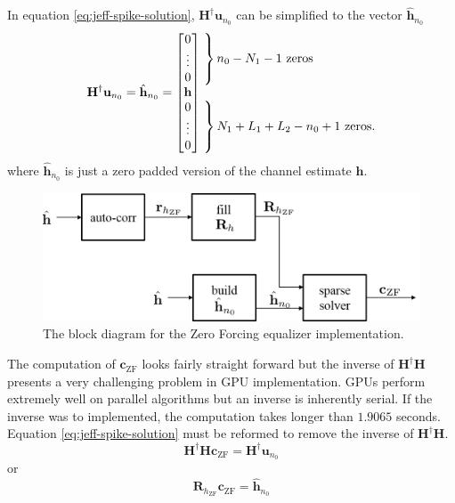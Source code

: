 In equation \eqref{eq:jeff-spike-solution}, $\mathbf{H}^\dag\mathbf{u}_{n_0}$ can be simplified to the vector $\hat{\mathbf{h}}_{n_0}$
\begin{equation}
	\mathbf{H}^\dag\mathbf{u}_{n_0} = \hat{\mathbf{h}}_{n_0} = \begin{bmatrix} 0 \\ \vdots \\ 0 \\ \mathbf{h} \\ 0 \\ \vdots \\ 0 \end{bmatrix}
	\begin{matrix*}[l] \left. \vphantom{\begin{matrix} 0 \\ \vdots \\ 0 \end{matrix}} \right\}
		\text{$n_0-N_1-1$ zeros}
		\\ \\
		\left. \vphantom{\begin{matrix} 0 \\ \vdots \\ 0 \end{matrix}} \right\}
		\text{$N_1+L_1+L_2-n_0+1$ zeros.}
		\end{matrix*}
\label{eq:hun0-vector-def}
\end{equation}
where $\hat{\mathbf{h}}_{n_0}$ is just a zero padded version of the channel estimate $\mathbf{h}$.

\begin{figure}
	\centering\includegraphics[width=\textwidth/10*8]{figures/gpu/ZFblock.png}
	\caption{The block diagram for the Zero Forcing equalizer implementation.}
	\label{fig:ZFblock}
\end{figure}

The computation of $\mathbf{c}_\text{ZF}$ looks fairly straight forward but the inverse of $\mathbf{H}^\dag\mathbf{H}$ presents a very challenging problem in GPU implementation.
GPUs perform extremely well on parallel algorithms but an inverse is inherently serial.
If the inverse was to implemented, the computation takes longer than $1.9065$ seconds.
Equation \eqref{eq:jeff-spike-solution} must be reformed to remove the inverse of $\mathbf{H}^\dag\mathbf{H}$.
\begin{equation}
	\mathbf{H}^\dag\mathbf{H}\mathbf{c}_\text{ZF} = \mathbf{H}^\dag\mathbf{u}_{n_0}
	\label{eq:jeff-spike-solution-reformed}
\end{equation}
or
\begin{equation}
	\mathbf{R}_{h_\text{ZF}} \mathbf{c}_\text{ZF} = \hat{\mathbf{h}}_{n_0}
	\label{eq:jeff-spike-solution-reformed_vectors}
\end{equation}


